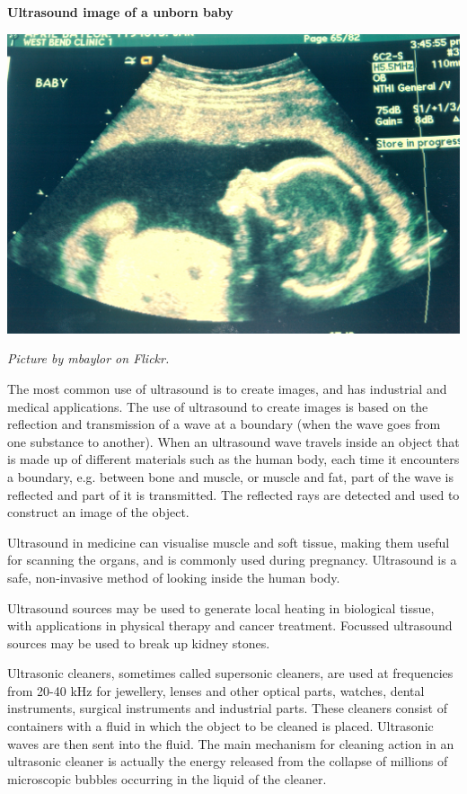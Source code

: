 \begin{minipage}{.5\textwidth}
\begin{center}
\textbf{Ultrasound image of a unborn baby}\par
\includegraphics[width=.8\columnwidth]{photos/ultrasound_mbaylor_flickr.jpg}
\par\textit{Picture by mbaylor on Flickr.}
\end{center}
\end{minipage}
\begin{minipage}{.5\textwidth}
      \label{m38800*id185140}The most common use of ultrasound is to create images, and has industrial and medical applications. The use of ultrasound to create images is based on the reflection and transmission of a wave at a boundary (when the wave goes from one substance to another). When an ultrasound wave travels inside an object that is made up of different materials such as the human body, each time it encounters a boundary, e.g. between bone and muscle, or muscle and fat, part of the wave is reflected and part of it is transmitted. The reflected rays are detected and used to construct an image of the object.\par 
      \label{m38800*id185148}Ultrasound in medicine can visualise muscle and soft tissue, making them useful for scanning the organs, and is commonly used during pregnancy. Ultrasound is a safe, non-invasive method of looking inside the human body.\par 
      
\end{minipage}
\label{m38800*id185154}Ultrasound sources may be used to generate local heating in biological tissue, with applications in physical therapy and cancer treatment. Focussed ultrasound sources may be used to break up kidney stones.\par 
      \label{m38800*id185159}Ultrasonic cleaners, sometimes called supersonic cleaners, are used at frequencies from 20-40 kHz for jewellery, lenses and other optical parts, watches, dental instruments, surgical instruments and industrial parts.
These cleaners consist of containers with a fluid in which the object to be cleaned is placed. Ultrasonic waves are then sent into the fluid. The main mechanism for cleaning action in an ultrasonic cleaner is actually the energy released from the collapse of millions of microscopic bubbles occurring in the liquid of the cleaner.\par 
\label{m38800*notfhsst!!!underscore!!!id482}


